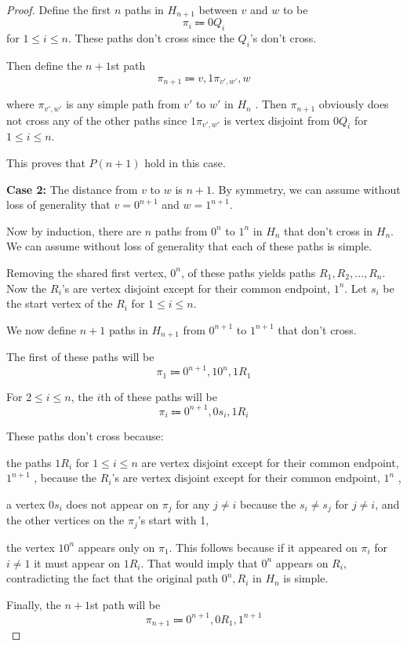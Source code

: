 \documentclass[14pt]{extarticle}
\begin{document}
\begin{proof}
Define the first $n$ paths in $H_{n+1}$ between $v$ and $w$ to be
$$
\pi_i \Coloneqq 0Q_i
$$
for $1 \leq i \leq n$. These paths don’t cross since the $Q_i$’s don’t cross.

Then define the $n + 1$st path
$$
\pi_{n+1} \Coloneqq v, 1\pi_{v',w'}, w
$$

where $\pi_{v' ,w'}$ is any simple path from $v'$ to $w'$ in $H_n$ . Then $\pi_{n+1}$ obviously does not cross any of the other paths since $1\pi_{v',w'}$ is vertex disjoint from $0Q_i$ for $1 \leq i \leq n$.

This proves that $P (n + 1)$ hold in this case.

{\bf Case 2:} The distance from $v$ to $w$ is $n + 1$. By symmetry, we can assume without loss of generality that $v = 0^{n+1}$ and $w = 1^{n+1}$.

Now by induction, there are $n$ paths from $0^n$ to $1^n$ in $H_n$ that don’t cross in $H_n$. We can assume without loss of generality that each of these paths is simple.

Removing the shared first vertex, $0^n$, of these paths yields paths $R_1 , R_2 , \ldots , R_n$. Now the $R_i$’s are vertex disjoint except for their common endpoint, $1^n$. Let $s_i$ be the start vertex of the $R_i$ for $1 \leq i \leq n$.

We now define $n + 1$ paths in $H_{n+1}$ from $0^{n+1}$ to $1^{n+1}$ that don’t cross.

The first of these paths will be
$$
\pi_1 \Coloneqq 0^{n+1} , 10^n , 1R_1
$$

For $2 \leq i \leq n$, the $i$th of these paths will be
$$
\pi_i \Coloneqq 0^{n+1} , 0s_i , 1R_i 
$$

These paths don’t cross because:

the paths $1R_i$ for $1 \leq i \leq n$ are vertex disjoint except for their common endpoint, $1^{n+1}$ , because the $R_i$’s are vertex disjoint except for their common endpoint, $1^n$ ,

a vertex $0s_i$ does not appear on $\pi_j$ for any $j \neq i$ because the $s_i \neq s_j$ for $j \neq i$, and the other vertices on the $\pi_j$’s start with 1, 

the vertex $10^n$ appears only on $\pi_1$. This follows because if it appeared on $\pi_i$ for $i \neq 1$ it must appear on $1R_i$. That would imply that $0^n$ appears on $R_i$, contradicting the fact that the original path $0^n , R_i$ in $H_n$ is simple.

Finally, the $n + 1$st path will be
$$
\pi_{n+1} \Coloneqq 0^{n+1} , 0R_1 , 1^{n+1}
$$


\end{proof}
\end{document}
